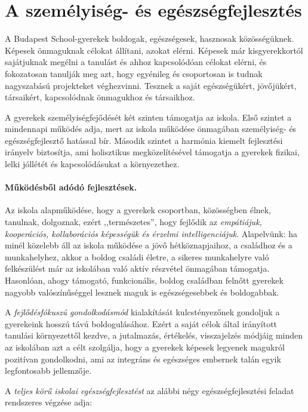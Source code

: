 \section{A személyiség- és egészségfejlesztés}
\label{sec:szemilyesegfejlesztes}

A Budapest School-gyerekek boldogak, egészségesek, hasznosak közösségüknek. Képesek önmaguknak célokat állítani, azokat elérni. Képesek  már kisgyerekkortól sajátjuknak megélni a tanulást és ahhoz kapcsolódóan célokat elérni, és fokozatosan tanulják meg azt, hogy egyénileg és csoportosan is tudnak nagyszabású projekteket véghezvinni. Tesznek a saját egészségükért, jövőjükért, társaikért, kapcsolódnak önmagukhoz és társaikhoz.

A gyerekek személyiségfejődését két szinten támogatja az iskola. Első szintet a mindennapi működés adja, mert az iskola működése önmagában személyiség- és egészségfejlesztő hatással bír. Második szintet a harmónia kiemelt fejlesztési irányelv biztosítja, ami holisztikus megközelítésével támogatja a gyerekek fizikai, lelki jóllétét és kapcsolódásukat a
környezethez.

\paragraph{Működésből adódó fejlesztések.}
Az iskola alapműködése, hogy a gyerekek csoportban, közösségben élnek, tanulnak, dolgoznak, ezért ,,természetes'', hogy fejlődik az \emph{empátiájuk, kooperációs, kollaborációs képességük és érzelmi intelligenciájuk}. Alapelvünk: ha minél közelebb áll az iskola működése a jövő hétköznapjaihoz, a családhoz és a munkahelyhez, akkor a boldog családi életre, a sikeres munkahelyre való felkészülést már az iskolában való aktív részvétel önmagában támogatja. Hasonlóan, ahogy támogató, funkcionális, boldog családban felnőtt gyerekek nagyobb valószínűséggel lesznek maguk is egészségesebbek és boldogabbak.

A \emph{fejlődésfókuszú gondolkodásmód} kialakítását  kulcstényezőnek gondoljuk a gyerekeink hosszú távú boldogulásához. Ezért a saját célok által irányított tanulási környezettől kezdve, a jutalmazás, értékelés, visszajelzés módjáig minden az iskolában azt a célt szolgálja, hogy a gyerekek képesek legyenek magukról pozitívan gondolkodni, ami az integráns és egészséges embernek talán egyik legfontosabb jellemzője.

A \emph{teljes körű iskolai egészségfejlesztést} az alábbi négy egészségfejlesztési feladat rendszeres végzése adja:

